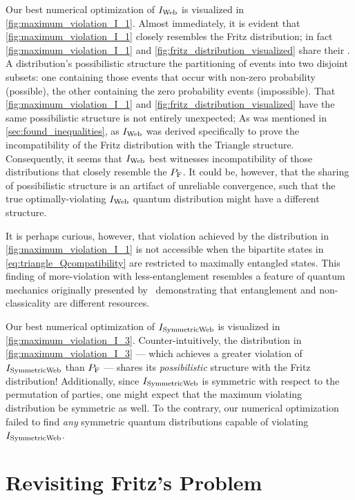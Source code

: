 \documentclass[aps, 10pt, english, twoside, pra, nofootinbib, tightenlines, longbibliography, superscriptaddress]{revtex4-1}
\begin{document}
    Our best numerical optimization of $I_\text{Web}$ is visualized in \cref{fig:maximum_violation_I_1}. Almost immediately, it is evident that \cref{fig:maximum_violation_I_1} closely resembles the Fritz distribution; in fact \cref{fig:maximum_violation_I_1} and \cref{fig:fritz_distribution_visualized} share their . A distribution's possibilistic structure the partitioning of events into two disjoint subsets: one containing those events that occur with non-zero probability (possible), the other containing the zero probability events (impossible).
    That \cref{fig:maximum_violation_I_1} and \cref{fig:fritz_distribution_visualized} have the same possibilistic structure is not entirely unexpected;  As was mentioned in \cref{sec:found_inequalities}, as $I_\text{Web}$ was derived specifically to prove the incompatibility of the Fritz distribution with the Triangle structure. Consequently, it seems that $I_\text{Web}$ best witnesses incompatibility of those distributions that closely resemble the $\prob[\fritz]$. It could be, however, that the sharing of possibilistic structure is an artifact of unreliable convergence, such that the true optimally-violating $I_\text{Web}$ quantum distribution might have a different structure.

    It is perhaps curious, however, that violation achieved by the distribution in \cref{fig:maximum_violation_I_1} is not accessible when the bipartite states in \cref{eq:triangle_Qcompatibility} are restricted to maximally entangled states. This finding of more-violation with less-entanglement resembles a feature of quantum mechanics originally presented by~\citet{Methot_2006} demonstrating that entanglement and non-classicality are different resources.

    Our best numerical optimization of $I_\text{SymmetricWeb}$ is visualized in \cref{fig:maximum_violation_I_3}. Counter-intuitively, the distribution in \cref{fig:maximum_violation_I_3} --- which achieves a greater violation of $I_\text{SymmetricWeb}$ than $\prob[\fritz]$ --- shares its \textit{possibilistic} structure with the Fritz distribution! Additionally, since $I_\text{SymmetricWeb}$ is symmetric with respect to the permutation of parties, one might expect that the maximum violating distribution be symmetric as well. To the contrary, our numerical optimization failed to find \emph{any} symmetric quantum distributions capable of violating $I_\text{SymmetricWeb}$.

    \section{Revisiting Fritz's Problem}
    \label{sec:fritz_problem_revisit}
\end{document}

